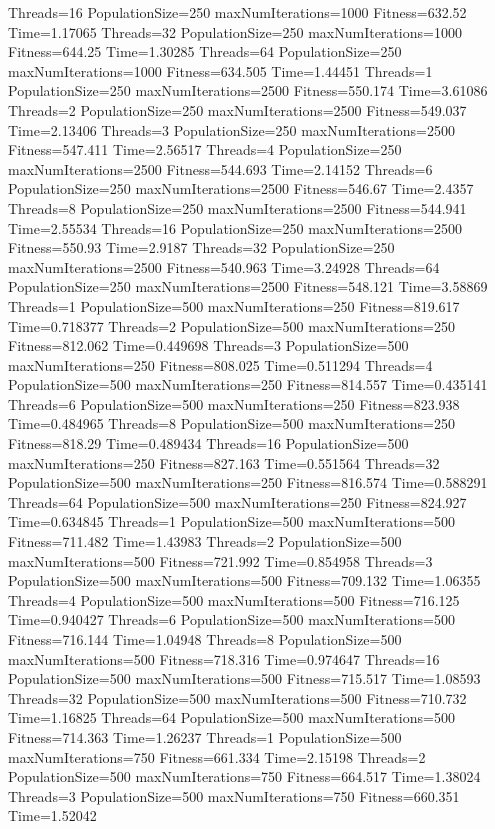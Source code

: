 \documentclass[10pt,letterpaper]{article}
\begin{document}
Threads=16 PopulationSize=250 maxNumIterations=1000 Fitness=632.52 Time=1.17065
Threads=32 PopulationSize=250 maxNumIterations=1000 Fitness=644.25 Time=1.30285
Threads=64 PopulationSize=250 maxNumIterations=1000 Fitness=634.505 Time=1.44451
Threads=1 PopulationSize=250 maxNumIterations=2500 Fitness=550.174 Time=3.61086
Threads=2 PopulationSize=250 maxNumIterations=2500 Fitness=549.037 Time=2.13406
Threads=3 PopulationSize=250 maxNumIterations=2500 Fitness=547.411 Time=2.56517
Threads=4 PopulationSize=250 maxNumIterations=2500 Fitness=544.693 Time=2.14152
Threads=6 PopulationSize=250 maxNumIterations=2500 Fitness=546.67 Time=2.4357
Threads=8 PopulationSize=250 maxNumIterations=2500 Fitness=544.941 Time=2.55534
Threads=16 PopulationSize=250 maxNumIterations=2500 Fitness=550.93 Time=2.9187
Threads=32 PopulationSize=250 maxNumIterations=2500 Fitness=540.963 Time=3.24928
Threads=64 PopulationSize=250 maxNumIterations=2500 Fitness=548.121 Time=3.58869
Threads=1 PopulationSize=500 maxNumIterations=250 Fitness=819.617 Time=0.718377
Threads=2 PopulationSize=500 maxNumIterations=250 Fitness=812.062 Time=0.449698
Threads=3 PopulationSize=500 maxNumIterations=250 Fitness=808.025 Time=0.511294
Threads=4 PopulationSize=500 maxNumIterations=250 Fitness=814.557 Time=0.435141
Threads=6 PopulationSize=500 maxNumIterations=250 Fitness=823.938 Time=0.484965
Threads=8 PopulationSize=500 maxNumIterations=250 Fitness=818.29 Time=0.489434
Threads=16 PopulationSize=500 maxNumIterations=250 Fitness=827.163 Time=0.551564
Threads=32 PopulationSize=500 maxNumIterations=250 Fitness=816.574 Time=0.588291
Threads=64 PopulationSize=500 maxNumIterations=250 Fitness=824.927 Time=0.634845
Threads=1 PopulationSize=500 maxNumIterations=500 Fitness=711.482 Time=1.43983
Threads=2 PopulationSize=500 maxNumIterations=500 Fitness=721.992 Time=0.854958
Threads=3 PopulationSize=500 maxNumIterations=500 Fitness=709.132 Time=1.06355
Threads=4 PopulationSize=500 maxNumIterations=500 Fitness=716.125 Time=0.940427
Threads=6 PopulationSize=500 maxNumIterations=500 Fitness=716.144 Time=1.04948
Threads=8 PopulationSize=500 maxNumIterations=500 Fitness=718.316 Time=0.974647
Threads=16 PopulationSize=500 maxNumIterations=500 Fitness=715.517 Time=1.08593
Threads=32 PopulationSize=500 maxNumIterations=500 Fitness=710.732 Time=1.16825
Threads=64 PopulationSize=500 maxNumIterations=500 Fitness=714.363 Time=1.26237
Threads=1 PopulationSize=500 maxNumIterations=750 Fitness=661.334 Time=2.15198
Threads=2 PopulationSize=500 maxNumIterations=750 Fitness=664.517 Time=1.38024
Threads=3 PopulationSize=500 maxNumIterations=750 Fitness=660.351 Time=1.52042
\end{document}
